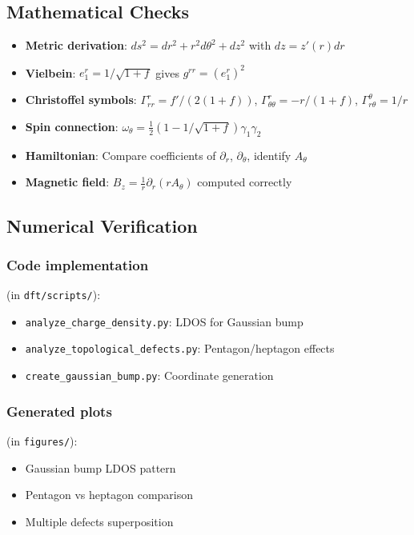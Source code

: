\documentclass[12pt]{article}
\begin{document}
\subsection{Mathematical Checks}

\begin{itemize}
    \item[\checkmark] \textbf{Metric derivation}: $ds^2 = dr^2 + r^2 d\theta^2 + dz^2$ with $dz = z'(r)dr$
    \item[\checkmark] \textbf{Vielbein}: $e_1^r = 1/\sqrt{1+f}$ gives $g^{rr} = (e_1^r)^2$
    \item[\checkmark] \textbf{Christoffel symbols}: $\Gamma^r_{rr} = f'/(2(1+f))$, $\Gamma^r_{\theta\theta} = -r/(1+f)$, $\Gamma^\theta_{r\theta} = 1/r$
    \item[\checkmark] \textbf{Spin connection}: $\omega_\theta = \frac{1}{2}(1 - 1/\sqrt{1+f})\gamma_1\gamma_2$
    \item[\checkmark] \textbf{Hamiltonian}: Compare coefficients of $\partial_r$, $\partial_\theta$, identify $A_\theta$
    \item[\checkmark] \textbf{Magnetic field}: $B_z = \frac{1}{r}\partial_r(r A_\theta)$ computed correctly
\end{itemize}

\subsection{Numerical Verification}

\subsubsection{Code implementation} (in \texttt{dft/scripts/}):
\begin{itemize}
    \item[\checkmark] \texttt{analyze\_charge\_density.py}: LDOS for Gaussian bump
    \item[\checkmark] \texttt{analyze\_topological\_defects.py}: Pentagon/heptagon effects
    \item[\checkmark] \texttt{create\_gaussian\_bump.py}: Coordinate generation
\end{itemize}

\subsubsection{Generated plots} (in \texttt{figures/}):
\begin{itemize}
    \item[\checkmark] Gaussian bump LDOS pattern
    \item[\checkmark] Pentagon vs heptagon comparison
    \item[\checkmark] Multiple defects superposition
\end{itemize}
\end{document}
